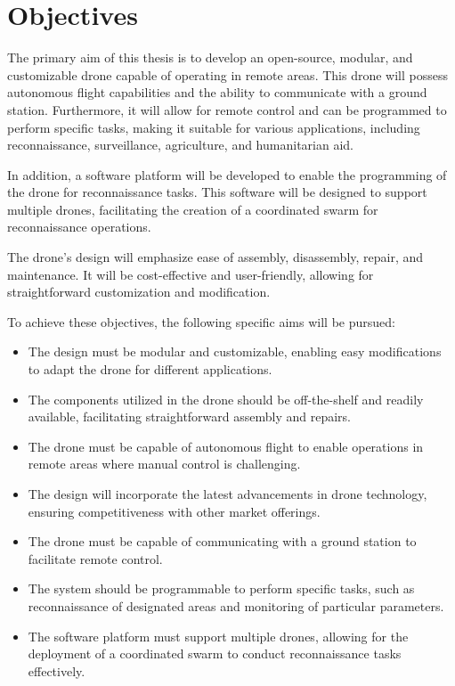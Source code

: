 \chapter{Objectives}
\label{ch:objectives}

The primary aim of this thesis is to develop an open-source, modular, and customizable drone capable of operating in remote areas. This drone will possess autonomous flight capabilities and the ability to communicate with a ground station. Furthermore, it will allow for remote control and can be programmed to perform specific tasks, making it suitable for various applications, including reconnaissance, surveillance, agriculture, and humanitarian aid.

In addition, a software platform will be developed to enable the programming of the drone for reconnaissance tasks. This software will be designed to support multiple drones, facilitating the creation of a coordinated swarm for reconnaissance operations.

The drone's design will emphasize ease of assembly, disassembly, repair, and maintenance. It will be cost-effective and user-friendly, allowing for straightforward customization and modification.

To achieve these objectives, the following specific aims will be pursued:

\begin{itemize}
  \item The design must be modular and customizable, enabling easy modifications to adapt the drone for different applications.

  \item The components utilized in the drone should be off-the-shelf and readily available, facilitating straightforward assembly and repairs.

  \item The drone must be capable of autonomous flight to enable operations in remote areas where manual control is challenging.

  \item The design will incorporate the latest advancements in drone technology, ensuring competitiveness with other market offerings.

  \item The drone must be capable of communicating with a ground station to facilitate remote control.

  \item The system should be programmable to perform specific tasks, such as reconnaissance of designated areas and monitoring of particular parameters.

  \item The software platform must support multiple drones, allowing for the deployment of a coordinated swarm to conduct reconnaissance tasks effectively.
\end{itemize}

